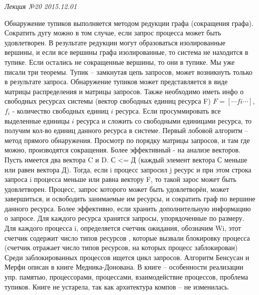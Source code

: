 \clearpage
\begin{flushright}
	\textit{Лекция №20}
	\textit{2015.12.01}
\end{flushright}

Обнаружение тупиков выполняется методом редукции графа (сокращения графа). Сократить дугу можно в том случае, если запрос процесса может быть удовлетворен. В результате редукции могут образоваться изолированные вершины, и если все вершины графа изолированные, то система  не находится в тупике. Если остались не сокращенные вершины, то они в тупике. Мы уже писали три теоремы. Тупик – замкнутая цепь запросов, может возникнуть только в результате запроса. Обнаружение тупиков может представляется в виде матрицы распределения и матрицы запросов. Также необходимо иметь инфо о свободных ресурсах системы (вектор свободных единиц ресурса F)
$F = [\cdots fi \cdots]$, $f_i$ - количество свободных единиц $i$ ресурса. Если просуммировать все выделенные единицы $i$ ресурса и сложить со свободными единицами ресурса, то получим кол-во единиц данного ресурса в системе. 
Первый лобовой алгоритм – метод прямого обнаружения. Просмотр по порядку матрицы запросов, и там где можно, производятся сокращения.
Более эффективный - на анализе векторов. Пусть имеется два вектора C  и  D. 
С <= Д (каждый элемент вектора С меньше или равен вектора Д). Тогда, если i процесс запросил j ресурс и при этом строка запроса i процесса меньше или равна вектору F, то такой зарос может быть удовлетворен. Процесс, запрос которого может быть удовлетворён, может завершиться, и освободить занимаемые им ресурсы, и сократить граф по вершине данного ресурса. 
Более эффективно, если хранить дополнительную информацию о запросе. Для каждого ресурса хранятся запросы, упорядоченные по размеру. Для каждого процесса i, определяется счетчик ожидания, обозначим Wi, этот счетчик содержит число типов ресурсов , которые вызвали блокировку процесса (счетчик отражает число типов ресурсов, на которых процесс заблокирован) Среди заблокированных процессов ищется цикл запросов. 
Алгоритм Бенсусан и Мерфи описан в книге Медника-Донована. В книге – особенности реализации упр. памятью, процессорами, процессами, взаимодействие процессов, проблема тупиков. Книге не устарела, так как архитектура компов – не изменилась.

